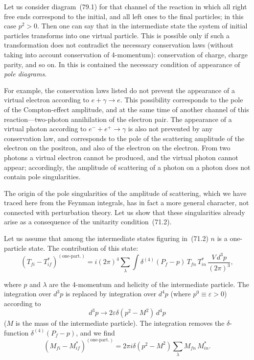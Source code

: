 Let us consider diagram~(79.1) for that channel of the reaction in which all right free ends correspond to the initial, and all left ones to the final particles; in this case $p^2 > 0$. Then one can say that in the intermediate state the system of initial particles transforms into one virtual particle. This is possible only if such a transformation does not contradict the necessary conservation laws (without taking into account conservation of 4-momentum): conservation of charge, charge parity, and so on. In this is contained the necessary condition of appearance of \textit{pole diagrams}.

For example, the conservation laws listed do not prevent the appearance of a virtual electron according to $e + \gamma \to e$. This possibility corresponds to the pole of the Compton-effect amplitude, and at the same time of another channel of this reaction---two-photon annihilation of the electron pair. The appearance of a virtual photon according to $e^- + e^+ \to \gamma$ is also not prevented by any conservation law, and corresponds to the pole of the scattering amplitude of the electron on the positron, and also of the electron on the electron. From two photons a virtual electron cannot be produced, and the virtual photon cannot appear; accordingly, the amplitude of scattering of a photon on a photon does not contain pole singularities.

The origin of the pole singularities of the amplitude of scattering, which we have traced here from the Feynman integrals, has in fact a more general character, not connected with perturbation theory. Let us show that these singularities already arise as a consequence of the unitarity condition~(71.2).

Let us assume that among the intermediate states figuring in~(71.2) $n$ is a one-particle state. The contribution of this state:
\[
(T_{fi} - T^*_{if})^{(\text{one-part.})} = i(2\pi)^4\sum_\lambda\int\delta^{(4)}(P_f - p)\,T_{fn}\,T^*_{in}\,\frac{V\,d^3p}{(2\pi)^3},
\]

where $p$ and $\lambda$ are the 4-momentum and helicity of the intermediate particle. The integration over $d^3p$ is replaced by integration over $d^4p$ (where $p^0 \equiv \varepsilon > 0$) according to
\[
d^3p \to 2\varepsilon\delta(p^2 - M^2)\,d^4p
\]
($M$ is the mass of the intermediate particle). The integration removes the $\delta$-function $\delta^{(4)}(P_f - p)$, and we find
\begin{equation}
(M_{fi} - M^*_{if})^{(\text{one-part.})} = 2\pi i\delta(p^2 - M^2)\sum_\lambda M_{fn}\,M^*_{in}.
\tag{79.3}
\end{equation}

